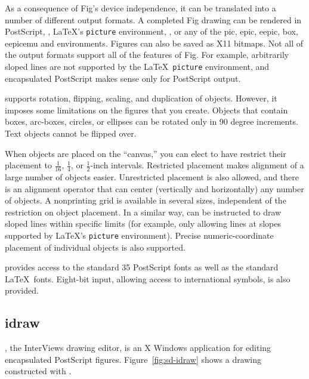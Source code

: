  As a consequence of Fig's device independence, it can be translated
  into a number of different output formats.  A completed Fig drawing
  can be rendered in PostScript, \PiCTeX,
\linebreak
\newpage
\LaTeX's \verb|picture|
  environment, \MF, or any of the pic, epic, eepic, box, eepicemu and
   environments.  Figures can also be saved as X11
  bitmaps.  Not all of the output formats support all of the features
  of Fig. For example, arbitrarily sloped lines are not supported by
  the \LaTeX\ \verb|picture| environment, and encapsulated PostScript
  makes sense only for PostScript output.

   supports rotation, flipping, scaling, and duplication
  of objects.  However, it imposes some limitations on the figures
  that you create.
  Objects that contain boxes, arc-boxes, circles, or ellipses can 
  be rotated only in 90 degree increments.  Text objects cannot be flipped
  over.

  When objects are placed on the ``canvas,'' you can elect to have
   restrict their placement to $\frac{1}{16}$, 
  $\frac{1}{4}$, or $\frac{1}{2}$-inch intervals.  Restricted placement
  makes alignment of a large number of objects easier.  Unrestricted
  placement is also allowed, and there is an alignment operator that
  can center (vertically and horizontally) any number of objects.
  A nonprinting grid is available in several sizes, independent of
  the restriction on object placement.
  In a similar way,  can be instructed to draw sloped
  lines within specific limits (for example, only allowing lines
  at slopes supported by \LaTeX's \verb|picture| environment).
  Precise numeric-coordinate placement of individual objects is 
  also supported.

   provides access to the standard 35 PostScript fonts
  as well as the standard \LaTeX\ fonts.  Eight-bit input, allowing
  access to international symbols, is also provided.

\subsection{idraw}

  , the InterViews drawing editor, is an X Windows 
  application for editing encapsulated PostScript figures.
  Figure~\ref{fig:sd-idraw} shows a drawing constructed with
  .


